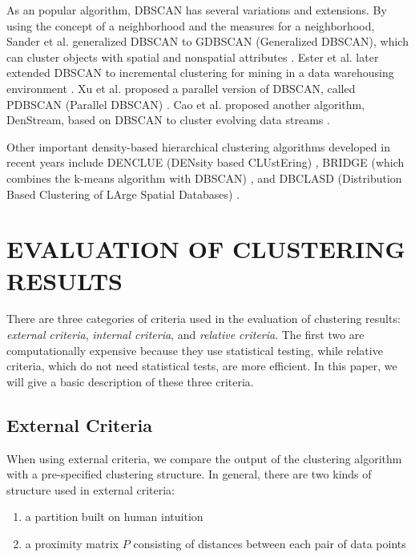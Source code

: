 \documentclass[conference]{IEEEtran}
\begin{document}
As an popular algorithm, DBSCAN has several variations and extensions. By using the concept of a neighborhood and the measures for a neighborhood, Sander et al. generalized
DBSCAN to GDBSCAN (Generalized DBSCAN), which can cluster objects with spatial and nonspatial attributes \cite{sander1998density}. Ester et al. later extended DBSCAN to incremental clustering for mining in a data warehousing environment \cite{ester1998incremental}. Xu et al. proposed a parallel version of DBSCAN, called PDBSCAN (Parallel DBSCAN) \cite{xu2002fast}. Cao et al. proposed another algorithm, DenStream, based on DBSCAN to cluster evolving data streams \cite{cao2006density}.

Other important density-based hierarchical clustering algorithms developed in recent years include DENCLUE (DENsity based CLUstEring) \cite{hinneburg1998efficient}, BRIDGE (which combines
the k-means algorithm with DBSCAN) \cite{dash20011+}, and DBCLASD (Distribution Based Clustering of LArge Spatial Databases) \cite{xu2002fast}.

\section{EVALUATION OF CLUSTERING RESULTS} \label{sec:evaluation}

There are three categories of criteria used in the evaluation of clustering results: \textit{external criteria}, \textit{internal criteria}, and \textit{relative criteria}. The first two are computationally expensive because they use statistical testing, while relative criteria, which do not need statistical tests, are more efficient. In this paper, we will give a basic description of these three criteria.

\subsection{External Criteria}
When using external criteria, we compare the output of the clustering algorithm with a pre-specified clustering structure. In general, there are two kinds of structure used in external criteria:

\begin{enumerate}
\item a partition built on human intuition
\item a proximity matrix $P$ consisting of distances between each pair of data points
\end{enumerate}
\end{document}
